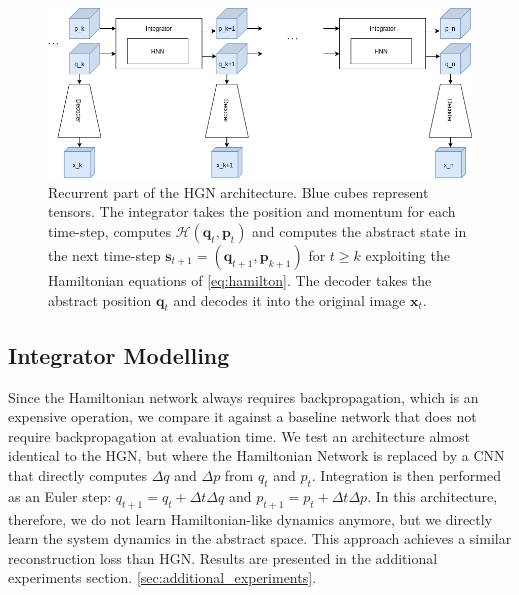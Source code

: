 \begin{figure}[h]
\centering
\includegraphics[width=\textwidth]{../openreview/pictures/rollout_architecture.png}
\caption{Recurrent part of the HGN architecture. Blue cubes represent tensors. The integrator takes the position and momentum for each time-step, computes $\mathcal{H}(\bm{q}_t, \bm{p}_t)$ and computes the abstract state in the next time-step $\bm{s}_{t+1} = (\bm{q}_{t+1}, \bm{p}_{k+1})$ for $t\ge k$ exploiting the Hamiltonian equations of \ref{eq:hamilton}. The decoder takes the abstract position $\bm{q}_{t}$ and decodes it into the original image $\bm{x}_t$.}
\label{fig:unroll}
\end{figure}


\subsection{Integrator Modelling}
\label{sec:integrator_modelling}
Since the Hamiltonian network always requires backpropagation, which is an expensive operation, we compare it against a baseline network that does not require backpropagation at evaluation time. We test an architecture almost identical to the HGN, but where the Hamiltonian Network is replaced by a CNN that directly computes $\Delta q$ and $\Delta p$ from $q_t$ and $p_t$. Integration is then performed as an Euler step: $q_{t+1} = q_t + \Delta t \Delta q$ and $p_{t+1} = p_t + \Delta t \Delta p$. In this architecture, therefore, we do not learn Hamiltonian-like dynamics anymore, but we directly learn the system dynamics in the abstract space. This approach achieves a similar reconstruction loss than HGN\cite{hgn}.
Results are presented in the additional experiments section.  \ref{sec:additional_experiments}.


